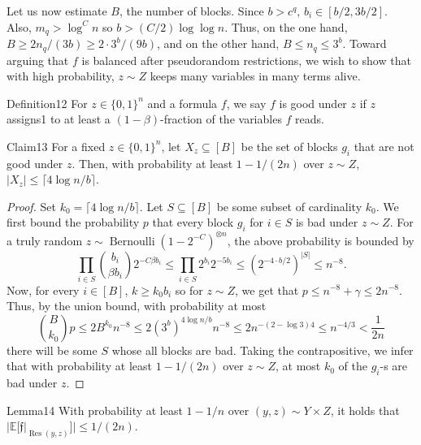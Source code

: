 Let us now estimate $B$, the number of blocks. Since $b>c^q$, $b_i\in[b/2,3b/2]$. Also, $m_q>\log^C n$ so $b>(C/2)\log\log n$. Thus, on the one hand, $B\ge2n_q/(3b)\ge2\cdot3^b/(9b)$, and on the other hand, $B\le n_q\le3^b$.
Toward arguing that $f$ is balanced after pseudorandom restrictions, we wish to show that with high probability, $z\sim Z$ keeps many variables in many terms alive.
\begin{authorclaim}{Definition12}
For $z\in\{0,1\}^n$ and a formula $f$, we say $f$ is good under $z$ if $z$ assigns1 to at least a $(1-\beta)$-fraction of the variables $f$ reads.
\end{authorclaim}
\begin{authorclaim}{Claim13}
For a fixed $z\in\{0,1\}^n$, let $X_z\subseteq[B]$ be the set of blocks $g_i$ that are not good under $z$. Then, with probability at least $1-1/(2n)$ over $z\sim Z$, $|X_z|\le\lceil4\log n/b\rceil$.
\end{authorclaim}
\begin{proof}
Set $k_0=\lceil4\log n/b\rceil$. Let $S\subseteq[B]$ be some subset of cardinality $k_0$. We first bound the probability $p$ that every block $g_i$ for $i\in S$ is bad under $z\sim Z$. For a truly random $z\sim\operatorname{Bernoulli}(1-2^{-C})^{\otimes n}$, the above probability is bounded by
\[
\prod_{i\in S}\binom{b_i}{\beta b_i}2^{-C\beta b_i}
\le\prod_{i\in S}2^{b_i}2^{-5b_i}
\le(2^{-4\cdot b/2})^{|S|}\le n^{-8}.
\]
Now, for every $i\in[B]$, $k\ge k_0b_i$ so for $z\sim Z$, we get that $p\le n^{-8}+\gamma\le2n^{-8}$. Thus, by the union bound, with probability at most
\[
\binom B{k_0}p\le2B^{k_0}n^{-8}
\le2(3^b)^{4\log n/b}n^{-8}
\le2n^{-(2-\log3)4}\le n^{-4/3}<\frac1{2n}
\]
there will be some $S$ whose all blocks are bad. Taking the contrapositive, we infer that with probability at least $1-1/(2n)$ over $z\sim Z$, at most $k_0$ of the $g_i$-s are bad under $z$.
\end{proof}
\begin{authorclaim}{Lemma14}
With probability at least $1-1/n$ over $(y,z)\sim Y\times Z$, it holds that $|\mathbb E[\mathfrak f|_{\operatorname{Res}(y,z)}]|\le1/(2n)$.
\end{authorclaim}
